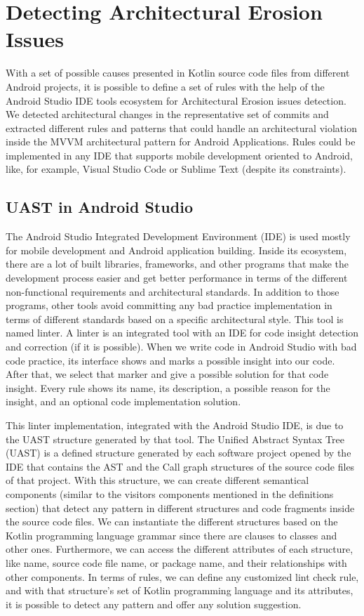 \chapter{Detecting Architectural Erosion Issues}
\label{cha:detection}

With a set of possible causes presented in Kotlin source code files from different Android projects, it is possible to define a set of rules with the help of the Android Studio IDE tools ecosystem for Architectural Erosion issues detection. We detected architectural changes in the representative set of commits and extracted different rules and patterns that could handle an architectural violation inside the MVVM architectural pattern for Android Applications. Rules could be implemented in any IDE that supports mobile development oriented to Android, like, for example, Visual Studio Code or Sublime Text (despite its constraints).


\section{UAST in Android Studio}
The Android Studio  Integrated Development Environment (IDE) is used mostly for mobile development and Android application building. Inside its ecosystem, there are a lot of built libraries, frameworks, and other programs that make the development process easier and get better performance in terms of the different non-functional requirements and architectural standards. In addition to those programs, other tools avoid committing any bad practice implementation in terms of different standards based on a specific architectural style. This tool is named linter. A linter is an integrated tool with an IDE for code insight detection and correction  (if it is possible). When we write code in Android Studio with bad code practice, its interface shows and marks a possible insight into our code. After that, we select that marker and give a possible solution for that code insight. Every rule shows its name, its description, a possible reason for the insight, and an optional code implementation solution.

This linter implementation, integrated with the Android Studio IDE, is due to the UAST structure generated by that tool. The Unified Abstract Syntax Tree (UAST) is a defined structure generated by each software project opened by the IDE that contains the AST and the Call graph structures of the source code files of that project. With this structure, we can create different semantical components (similar to the visitors components mentioned in the definitions section) that detect any pattern in different structures and code fragments inside the source code files. We can instantiate the different structures based on the Kotlin programming language grammar since there are clauses to classes and other ones. Furthermore, we can access the different attributes of each structure, like name, source code file name, or package name, and their relationships with other components. In terms of rules, we can define any customized lint check rule, and with that structure's set of Kotlin programming language and its attributes, it is possible to detect any pattern and offer any solution suggestion.

